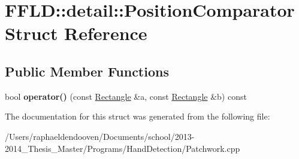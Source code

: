 \hypertarget{struct_f_f_l_d_1_1detail_1_1_position_comparator}{\section{F\-F\-L\-D\-:\-:detail\-:\-:Position\-Comparator Struct Reference}
\label{struct_f_f_l_d_1_1detail_1_1_position_comparator}
}
\subsection*{Public Member Functions}
\begin{DoxyCompactItemize}
\item 
\hypertarget{struct_f_f_l_d_1_1detail_1_1_position_comparator_a18bec662e49d613889bf64fbb88c3b87}{bool {\bfseries operator()} (const \hyperlink{class_f_f_l_d_1_1_rectangle}{Rectangle} \&a, const \hyperlink{class_f_f_l_d_1_1_rectangle}{Rectangle} \&b) const }\label{struct_f_f_l_d_1_1detail_1_1_position_comparator_a18bec662e49d613889bf64fbb88c3b87}

\end{DoxyCompactItemize}


The documentation for this struct was generated from the following file\-:\begin{DoxyCompactItemize}
\item 
/\-Users/raphaeldendooven/\-Documents/school/2013-\/2014\-\_\-\-Thesis\-\_\-\-Master/\-Programs/\-Hand\-Detection/Patchwork.\-cpp\end{DoxyCompactItemize}
